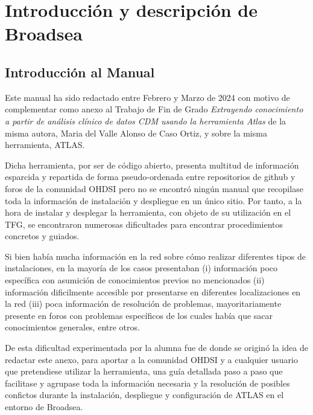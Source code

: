 \chapter{Introducción y descripción de Broadsea} \label{cap:01Introduccion}

\section{Introducción al Manual} \label{cap:01.1IntroManual}

Este manual ha sido redactado entre Febrero y Marzo de 2024 con motivo de complementar como anexo al Trabajo de Fin de Grado \textit{Extrayendo conocimiento a partir de análisis clínico de datos CDM usando la herramienta Atlas}
de la misma autora, Maria del Valle Alonso de Caso Ortiz, y sobre la misma herramienta, ATLAS.


Dicha herramienta, por ser de código abierto, presenta multitud de información esparcida y repartida de forma pseudo-ordenada entre repositorios de github y foros de la comunidad OHDSI pero no se encontró ningún manual que recopilase toda la información de instalación y despliegue en un único sitio. Por tanto, a la hora de instalar y desplegar la herramienta, con objeto de su utilización en el TFG, se encontraron numerosas dificultades para encontrar procedimientos concretos y guiados.

Si bien había mucha información en la red sobre cómo realizar diferentes tipos de instalaciones, en la mayoría de los casos presentaban (i) información poco específica con asumición de conocimientos previos no mencionados (ii) información dificilmente accesible por presentarse en diferentes localizaciones en la red (iii) poca información de resolución de problemas, mayoritariamente presente en foros con problemas específicos de los cuales había que sacar conocimientos generales, entre otros.  

De esta dificultad experimentada por la alumna fue de donde se originó la idea de redactar este anexo, para aportar a la comunidad OHDSI y a cualquier usuario que pretendiese utilizar la herramienta, una guía detallada paso a paso que facilitase y agrupase toda la información necesaria y la resolución de posibles confictos durante la instalación, despliegue y configuración de ATLAS en el entorno de Broadsea. 

